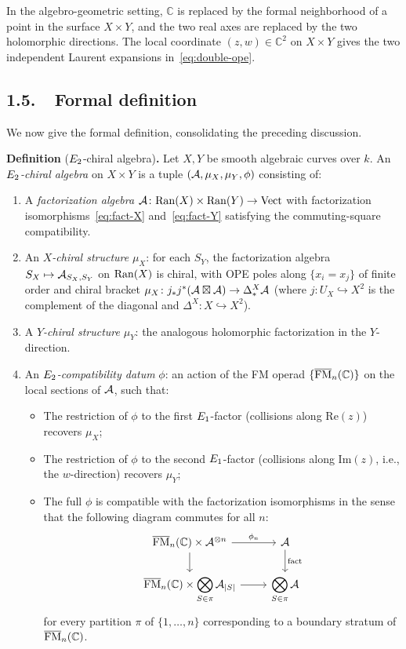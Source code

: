 In the algebro-geometric setting, $\mathbb{C}$ is replaced by the formal
neighborhood of a point in the surface $X \times Y$, and the two real axes
are replaced by the two holomorphic directions. The local coordinate
$(z, w) \in \mathbb{C}^2$ on $X \times Y$ gives the two independent
Laurent expansions in~\eqref{eq:double-ope}.

\subsection*{1.5.\ \ Formal definition}

We now give the formal definition, consolidating the preceding discussion.

\medskip
\noindent\textbf{Definition} ($E_2$-chiral algebra)\textbf{.}\;
Let $X, Y$ be smooth algebraic curves over $k$. An \emph{$E_2$-chiral
algebra} on $X \times Y$ is a tuple $(\mathcal{A}, \mu_X, \mu_Y, \phi)$
consisting of:
\begin{enumerate}[label=(\roman*)]
 \item A \emph{factorization algebra}
 $\mathcal{A}\colon \mathrm{Ran}(X) \times \mathrm{Ran}(Y) \to \mathrm{Vect}$
 with factorization isomorphisms~\eqref{eq:fact-X}
 and~\eqref{eq:fact-Y} satisfying the commuting-square compatibility.

 \item An \emph{$X$-chiral structure} $\mu_X$: for each $S_Y$, the
 factorization algebra $S_X \mapsto \mathcal{A}_{S_X, S_Y}$ on $\mathrm{Ran}(X)$
 is chiral, with OPE poles along $\{x_i = x_j\}$ of finite order
 and chiral bracket
 $\mu_X \colon j_*j^*(\mathcal{A} \boxtimes \mathcal{A}) \to
 \Delta_*^X \mathcal{A}$ (where $j\colon U_X \hookrightarrow X^2$ is the
 complement of the diagonal and $\Delta^X\colon X \hookrightarrow X^2$).

 \item A \emph{$Y$-chiral structure} $\mu_Y$: the analogous holomorphic
 factorization in the $Y$-direction.

 \item An \emph{$E_2$-compatibility datum} $\phi$: an action of the
 FM operad $\{\overline{\mathrm{FM}}_n(\mathbb{C})\}$ on the local sections of $\mathcal{A}$,
 such that:
 \begin{itemize}
 \item The restriction of $\phi$ to the first $E_1$-factor
 (collisions along $\mathrm{Re}(z)$) recovers $\mu_X$;
 \item The restriction of $\phi$ to the second $E_1$-factor
 (collisions along $\mathrm{Im}(z)$, i.e., the $w$-direction)
 recovers $\mu_Y$;
 \item The full $\phi$ is compatible with the factorization
 isomorphisms in the sense that the following diagram commutes
 for all $n$:
 \[
 \begin{tikzcd}
 \FM_n(\mathbb{C}) \times \cA^{\otimes n}
 \ar[r, "\phi_n"] \ar[d]
 & \cA \ar[d, "\mathrm{fact}"] \\
 \FM_n(\mathbb{C}) \times
 \displaystyle\bigotimes_{S \in \pi} \cA_{|S|}
 \ar[r]
 & \displaystyle\bigotimes_{S \in \pi} \cA
 \end{tikzcd}
 \]
 for every partition $\pi$ of $\{1, \ldots, n\}$
 corresponding to a boundary stratum of $\overline{\mathrm{FM}}_n(\mathbb{C})$.
 \end{itemize}
\end{enumerate}

